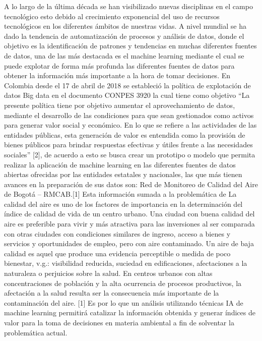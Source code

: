 A lo largo de la última década se han visibilizado nuevas disciplinas en el campo tecnológico esto debido al crecimiento exponencial del uso de recursos tecnológicos en los diferentes ámbitos de nuestras vidas. A nivel mundial se ha dado la tendencia de automatización de procesos y análisis de datos, donde el objetivo es la identificación de patrones y tendencias en muchas diferentes fuentes de datos, una de las más destacada es el machine learning mediante el cual se puede explotar de forma más profunda las diferentes fuentes de datos para obtener la información más importante a la hora de tomar decisiones.
En Colombia desde el 17 de abril de 2018 se estableció la política de explotación de datos Big data en el documento CONPES 3920 la cual tiene como objetivo “La presente política tiene por objetivo aumentar el aprovechamiento de datos, mediante el desarrollo de las condiciones para que sean gestionados como activos para generar valor social y económico. En lo que se refiere a las actividades de las entidades públicas, esta generación de valor es entendida como la provisión de bienes públicos para brindar respuestas efectivas y útiles frente a las necesidades sociales” [2], de acuerdo a esto se busca crear un prototipo o modelo que permita realizar la aplicación de machine learning   en las diferentes fuentes de datos abiertas ofrecidas por las entidades estatales y nacionales, las que más tienen avances en la preparación de sus datos son: Red de Monitoreo de Calidad del Aire de Bogotá – RMCAB.[1]
Esta información sumada a la problemática de La calidad del aire es uno de los factores de importancia en la determinación del índice de calidad de vida de un centro urbano. 
Una ciudad con buena calidad del aire es preferible para vivir y más atractiva para las inversiones al ser comparada con otras ciudades con condiciones similares de ingreso, acceso a bienes y servicios y oportunidades de empleo, pero con aire contaminado. Un aire de baja calidad es aquel que produce una evidencia perceptible o medida de poco bienestar, v.g.: visibilidad reducida, suciedad en edificaciones, afectaciones a la naturaleza o perjuicios sobre la salud. En centros urbanos con altas concentraciones de población y la alta ocurrencia de procesos productivos, la afectación a la salud resulta ser la consecuencia más importante de la contaminación del aire. [1]
Es por lo que un análisis utilizando técnicas IA de machine learning permitirá catalizar la información obtenida y generar índices de valor para la toma de decisiones en materia ambiental a fin de solventar la problemática actual.
 


